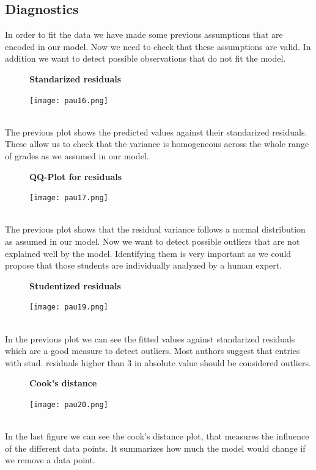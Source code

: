\documentclass[a4paper, 11pt]{article}
\theoremstyle{definition}
\numberwithin{equation}{section}		%
\numberwithin{table}{section}				%
\begin{document}
\subsection{Diagnostics}
In order to fit the data we have made some previous assumptions that are encoded in our model. Now we need to check that these assumptions are valid. In addition we want to detect possible observations that do not fit the model.
\begin{figure}[ht]\centering
\textbf{Standarized residuals}\par\medskip
\texttt{[image: pau16.png]}
\end{figure}
\\
The previous plot shows the predicted values against their standarized residuals. These allow us to check that the variance is homogeneous across the whole range of grades as we assumed in our model.
\begin{figure}[ht]\centering
\textbf{QQ-Plot for residuals}\par\medskip
\texttt{[image: pau17.png]}
\end{figure}
\\
The previous plot shows that the residual variance follows a normal distribution as assumed in our model.
\newpage
Now we want to detect possible outliers that are not explained well by the model. Identifying them is very important as we could propose that those students are individually analyzed by a human expert.
\begin{figure}[ht]\centering
\textbf{Studentized residuals}\par\medskip
\texttt{[image: pau19.png]}
\end{figure}
\\
In the previous plot we can see the fitted values against standarized residuals which are a good measure to detect outliers. Most authors suggest that entries with stud. residuals higher than 3 in absolute value should be considered outliers.
\begin{figure}[ht]\centering
\textbf{Cook's distance}\par\medskip
\texttt{[image: pau20.png]}
\end{figure}
\\
In the last figure we can see the cook's distance plot, that measures the influence of the different data points. It summarizes how much the model would change if we remove a data point.
\newpage
\end{document}
